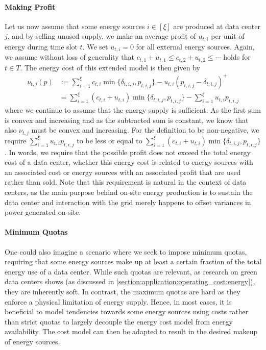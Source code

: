 \paragraph{Making Profit} Let us now assume that some energy sources $i \in [\xi]$ are produced at data center $j$, and by selling unused supply, we make an average profit of $u_{t,i}$ per unit of energy during time slot $t$. We set $u_{t,i} = 0$ for all external energy sources. Again, we assume without loss of generality that $c_{t,1} + u_{t,1} \leq c_{t,2} + u_{t,2} \leq \cdots$ holds for $t \in T$. The energy cost of this extended model is then given by \begin{align*}
    \nu_{t,j}(p) &:= \sum_{i=1}^{\xi} c_{t,i} \min\{\delta_{t,i,j}, p_{t,i,j}\} - u_{t,i} (p_{t,i,j} - \delta_{t,i,j})^+ \\
                 &= \sum_{i=1}^{\xi} (c_{t,i} + u_{t,i}) \min\{\delta_{t,i,j}, p_{t,i,j}\} - \sum_{i=1}^{\xi} u_{t,i} p_{t,i,j}
\end{align*} where we continue to assume that the energy supply is sufficient. As the first sum is convex and increasing and as the subtracted sum is constant, we know that also $\nu_{t,j}$ must be convex and increasing. For the definition to be non-negative, we require $\sum_{i=1}^{\xi} u_{t,i} p_{t,i,j}$ to be less or equal to $\sum_{i=1}^{\xi} (c_{t,i} + u_{t,i}) \min\{\delta_{t,i,j}, p_{t,i,j}\}$. In words, we require that the possible profit does not exceed the total energy cost of a data center, whether this energy cost is related to energy sources with an associated cost or energy sources with an associated profit that are used rather than sold. Note that this requirement is natural in the context of data centers, as the main purpose behind on-site energy production is to sustain the data center and interaction with the grid merely happens to offset variances in power generated on-site.

\paragraph{Minimum Quotas} One could also imagine a scenario where we seek to impose minimum quotas, requiring that some energy sources make up at least a certain fraction of the total energy use of a data center. While such quotas are relevant, as research on green data centers shows (as discussed in \cref{section:application:operating_cost:energy}), they are inherently soft. In contrast, the maximum quotas are hard as they enforce a physical limitation of energy supply. Hence, in most cases, it is beneficial to model tendencies towards some energy sources using costs rather than strict quotas to largely decouple the energy cost model from energy availability. The cost model can then be adapted to result in the desired makeup of energy sources.

